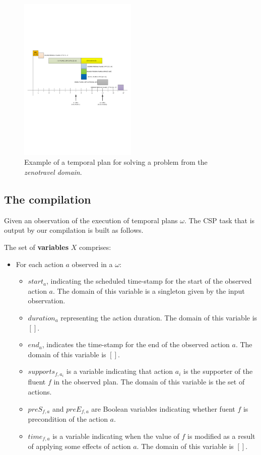 \documentclass[letterpaper]{article} %
\begin{document}
\begin{figure}[hbt!]
        \includegraphics[width=0.5\textwidth]{plan.pdf}
	\caption{Example of a temporal plan for solving a problem from the {\em zenotravel domain}.}
	\label{fig:plan}
\end{figure}

\subsection{The compilation}
Given an observation of the execution of temporal plans $\omega$. The CSP task that is output by our compilation is built as follows.

The set of {\bf variables} $X$ comprises:
\begin{itemize}
\item For each action $a$ observed in a $\omega$:
\begin{itemize}
\item $start_a$, indicating the scheduled time-stamp for the start of the observed action $a$. The domain of this variable is a singleton given by the input observation.
\item $duration_a$ representing the action duration. The domain of this variable is $[]$.
\item $end_a$, indicates the time-stamp for the end of the observed action $a$. The domain of this variable is $[]$.
\item $supports_{f,a_i}$ is a variable indicating that action $a_i$ is the supporter of the fluent $f$ in the observed plan. The domain of this variable is the set of actions.
\item $preS_{f,a}$ and $preE_{f,a}$ are Boolean variables indicating whether fuent $f$ is precondition of the action $a$.
\item $time_{f,a}$ is a variable indicating when the value of $f$ is modified as a result of applying some effects of action $a$. The domain of this variable is $[]$.
\end{itemize}
\end{itemize}
\end{document}
